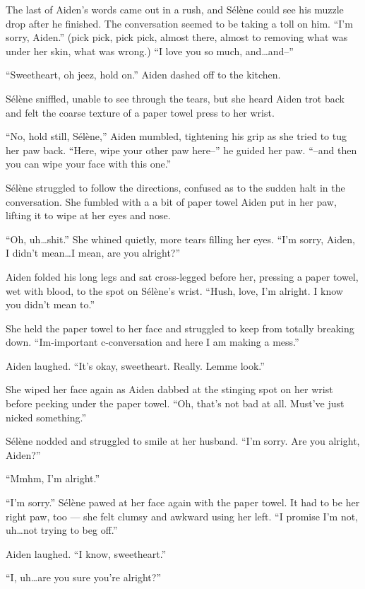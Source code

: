 The last of Aiden's words came out in a rush, and Sélène could see his muzzle drop after he finished. The conversation seemed to be taking a toll on him. ``I'm sorry, Aiden.'' (pick pick, pick pick, almost there, almost to removing what was under her skin, what was wrong.) ``I love you so much, and\ldots{}and--''

``Sweetheart, oh jeez, hold on.'' Aiden dashed off to the kitchen.

Sélène sniffled, unable to see through the tears, but she heard Aiden trot back and felt the coarse texture of a paper towel press to her wrist.

``No, hold still, Sélène,'' Aiden mumbled, tightening his grip as she tried to tug her paw back. ``Here, wipe your other paw here--'' he guided her paw. ``--and then you can wipe your face with this one.''

Sélène struggled to follow the directions, confused as to the sudden halt in the conversation. She fumbled with a a bit of paper towel Aiden put in her paw, lifting it to wipe at her eyes and nose.

``Oh, uh\ldots{}shit.'' She whined quietly, more tears filling her eyes. ``I'm sorry, Aiden, I didn't mean\ldots{}I mean, are you alright?''

Aiden folded his long legs and sat cross-legged before her, pressing a paper towel, wet with blood, to the spot on Sélène's wrist. ``Hush, love, I'm alright. I know you didn't mean to.''

She held the paper towel to her face and struggled to keep from totally breaking down. ``Im-important c-conversation and here I am making a mess.''

Aiden laughed. ``It's okay, sweetheart. Really. Lemme look.''

She wiped her face again as Aiden dabbed at the stinging spot on her wrist before peeking under the paper towel. ``Oh, that's not bad at all. Must've just nicked something.''

Sélène nodded and struggled to smile at her husband. ``I'm sorry. Are you alright, Aiden?''

``Mmhm, I'm alright.''

``I'm sorry.'' Sélène pawed at her face again with the paper towel. It had to be her right paw, too --- she felt clumsy and awkward using her left. ``I promise I'm not, uh\ldots{}not trying to beg off.''

Aiden laughed. ``I know, sweetheart.''

``I, uh\ldots{}are you sure you're alright?''

